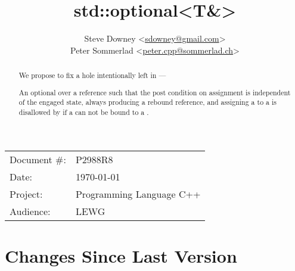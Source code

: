 \documentclass[a4paper,10pt,oneside,openany,final,article]{memoir}
\begin{document}
\title{std::optional<T\&>}
\author{
  Steve Downey \small<\href{mailto:sdowney@gmail.com}{sdowney@gmail.com}> \\
  Peter Sommerlad \small<\href{mailto:peter.cpp@sommerlad.ch}{peter.cpp@sommerlad.ch}> \\
}
\date{} %
\maketitle

\begin{flushright}
  \begin{tabular}{ll}
    Document \#: & P2988R8 \\
    Date: & \today \\
    Project: & Programming Language C++ \\
    Audience: & LEWG
  \end{tabular}
\end{flushright}

\begin{abstract}
  We propose to fix a hole intentionally left in  ---

  An optional over a reference such that the post condition on assignment is independent of the engaged state, always producing a rebound reference, and assigning a  to a  is disallowed by  if a  can not be bound to a .
\end{abstract}

\tableofcontents*

\chapter*{Changes Since Last Version}
\end{document}
